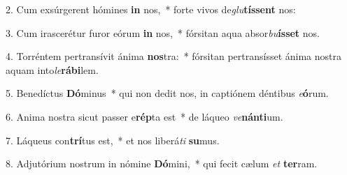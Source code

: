 2. Cum exsúrgerent hómines \textbf{in} nos,~*  forte vivos de\textit{glu}\textbf{tís}\textbf{sent} nos:\

3. Cum irascerétur furor eórum \textbf{in} nos,~*  fórsitan aqua absor\textit{bu}\textbf{ís}\textbf{set} nos.\

4. Torréntem pertransívit ánima \textbf{nos}tra:~*  fórsitan pertransísset ánima nostra aquam into\textit{le}\textbf{rá}\textbf{bi}lem.\

5. Benedíctus \textbf{Dó}minus~*  qui non dedit nos, in captiónem déntibus \textit{e}\textbf{ó}rum.\

6. Anima nostra sicut passer e\textbf{rép}ta est~*  de láqueo \textit{ve}\textbf{nán}\textbf{ti}um.\

7. Láqueus con\textbf{trí}tus est,~*  et nos liberá\textit{ti} \textbf{su}mus.\

8. Adjutórium nostrum in nómine \textbf{Dó}mini,~*  qui fecit cælum \textit{et} \textbf{ter}ram.\

